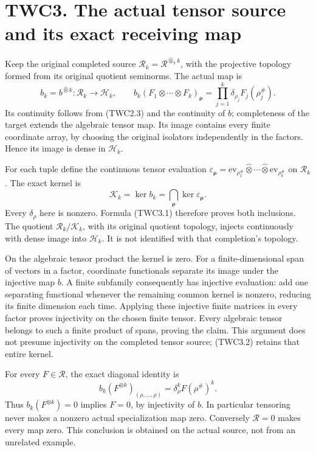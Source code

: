 \section{TWC3. The actual tensor source and its exact receiving
map}\label{twc3.-the-actual-tensor-source-and-its-exact-receiving-map}

Keep the original completed source
\(\mathscr R_k=\mathcal R^{\widehat\otimes_\pi k}\), with the projective
topology formed from its original quotient seminorms. The actual map is
\[
b_k=b^{\widehat\otimes k}:\mathscr R_k\longrightarrow\mathscr H_k,
\qquad
b_k(F_1\otimes\cdots\otimes F_k)_{\boldsymbol\rho}
=\prod_{j=1}^k\delta_{\rho_j}F_j(\rho_j^\#).
\tag{TWC3.1}
\] Its continuity follows from (TWC2.3) and the continuity of \(b\);
completeness of the target extends the algebraic tensor map. Its image
contains every finite coordinate array, by choosing the original
isolators independently in the factors. Hence its image is dense in
\(\mathscr H_k\).

For each tuple define the continuous tensor evaluation
\(\varepsilon_{\boldsymbol\rho}=\mathrm{ev}_{\rho_1^\#}\widehat\otimes\cdots\widehat\otimes\mathrm{ev}_{\rho_k^\#}\)
on \(\mathscr R_k\). The exact kernel is \[
\mathscr K_k=\ker b_k=\bigcap_{\boldsymbol\rho}\ker\varepsilon_{\boldsymbol\rho}.
\tag{TWC3.2}
\] Every \(\delta_\rho\) here is nonzero. Formula (TWC3.1) therefore
proves both inclusions. The quotient \(\mathscr R_k/\mathscr K_k\), with
its original quotient topology, injects continuously with dense image
into \(\mathscr H_k\). It is not identified with that completion's
topology.

On the algebraic tensor product the kernel is zero. For a
finite-dimensional span of vectors in a factor, coordinate functionals
separate its image under the injective map \(b\). A finite subfamily
consequently has injective evaluation: add one separating functional
whenever the remaining common kernel is nonzero, reducing its finite
dimension each time. Applying these injective finite matrices in every
factor proves injectivity on the chosen finite tensor. Every algebraic
tensor belongs to such a finite product of spans, proving the claim.
This argument does not presume injectivity on the completed tensor
source; (TWC3.2) retains that entire kernel.

For every \(F\in\mathcal R\), the exact diagonal identity is \[
b_k(F^{\otimes k})_{(\rho,\ldots,\rho)}
=\delta_\rho^k F(\rho^\#)^k.
\tag{TWC3.3}
\] Thus \(b_k(F^{\otimes k})=0\) implies \(F=0\), by injectivity of
\(b\). In particular tensoring never makes a nonzero actual
specialization map zero. Conversely \(\mathcal R=0\) makes every map
zero. This conclusion is obtained on the actual source, not from an
unrelated example.

